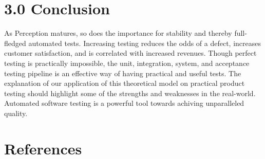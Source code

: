 \documentclass[12pt]{report}
\begin{document}
\newpage\thispagestyle{fancy}\sectionfont{\scshape}
\section*{3.0 Conclusion}
\par\noindent
As Perception matures, so does the importance for stability and thereby full-fledged automated tests. Increasing testing reduces the odds of a defect, increases customer satisfaction, and is correlated with increased revenues. Though perfect testing is practically impossible, the unit, integration, system, and acceptance testing pipeline is an effective way of having practical and useful tests. The explanation of our application of this theoretical model on practical product testing should highlight some of the strengths and weaknesses in the real-world. Automated software testing is a powerful tool towards achiving unparalleled quality.

 \noindent

\newpage
\section*{References}
\end{document}
